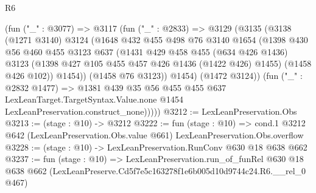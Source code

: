 \begin{lexlean}{R6}
\begin{coremodule}
          (fun ("_" : @3077) =>
          @3117
            (fun ("_" : @2833) =>
            @3129
              (@3135
                (@3138
                  (@1271 @3140)
                  @3124
                  (@1648
                    @432
                    @455
                    @498
                    @76
                    @3140
                    @1654
                    (@1398
                      @430
                      @56
                      @460
                      @455
                      @3123
                      @637
                      (@1431
                        @429
                        @458
                        @455
                        (@634 @426 @1436)
                        @3123
                        (@1398 @427 @105 @455 @457 @426 @1436 (@1422 @426) @1455)
                        (@1458 @426 @102))
                      @1454))
                  (@1458 @76 @3123))
                @1454)
              (@1472 @3124))
            (fun ("_" : @2832 @1477) =>
            @1381
              @439
              @35
              @56
              @455
              @455
              @637
              LexLeanTarget.TargetSyntax.Value.none
              @1454
              LexLeanPreservation.construct_none)))))
@3212 := LexLeanPreservation.Obs
@3213 := (stage : @10) -> @3212
@3222 := fun (stage : @10) =>
  cond.{1} @3212 @642 (LexLeanPreservation.Obs.value @661) LexLeanPreservation.Obs.overflow
@3228 := (stage : @10) -> LexLeanPreservation.RunConv @630 @18 @638 @662
@3237 := fun (stage : @10) =>
  LexLeanPreservation.run_of_funRel
    @630
    @18
    @638
    @662
    (LexLeanPreserve.Cd5f7e5c163278f1e6b005d10d9744c24.R6.__rel_0 @467)
\end{coremodule}
\end{lexlean}
